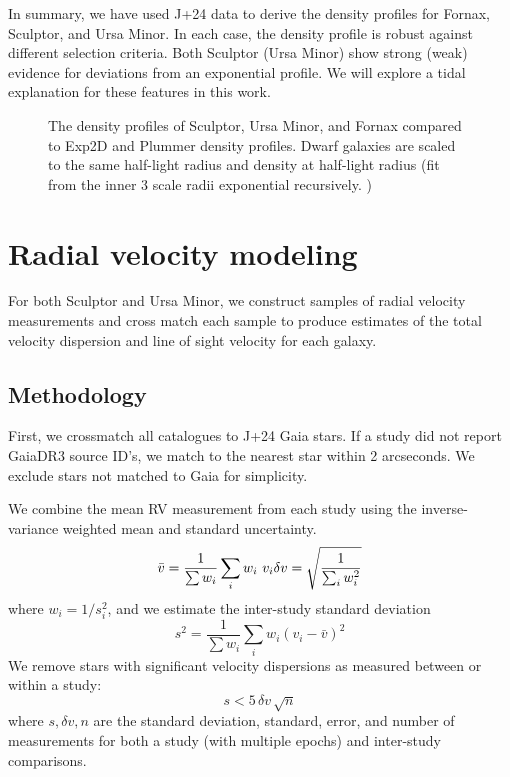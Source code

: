In summary, we have used J+24 data to derive the density profiles for
Fornax, Sculptor, and Ursa Minor. In each case, the density profile is
robust against different selection criteria. Both Sculptor (Ursa Minor)
show strong (weak) evidence for deviations from an exponential profile.
We will explore a tidal explanation for these features in this work.

\begin{figure}
\centering
{}
\caption[Classical dwarf density profiles]{The density profiles of
Sculptor, Ursa Minor, and Fornax compared to Exp2D and Plummer density
profiles. Dwarf galaxies are scaled to the same half-light radius and
density at half-light radius (fit from the inner 3 scale radii
exponential recursively. )}\label{fig:classical_dwarfs_densities}
\end{figure}

\section{Radial velocity modeling}\label{radial-velocity-modeling}

For both Sculptor and Ursa Minor, we construct samples of radial
velocity measurements and cross match each sample to produce estimates
of the total velocity dispersion and line of sight velocity for each
galaxy.

\subsection{Methodology}\label{methodology}

First, we crossmatch all catalogues to J+24 Gaia stars. If a study did
not report GaiaDR3 source ID's, we match to the nearest star within 2
arcseconds. We exclude stars not matched to Gaia for simplicity.

We combine the mean RV measurement from each study using the
inverse-variance weighted mean and standard uncertainty. \[
\bar v = \frac{1}{\sum w_i}\sum_i w_i\ v_{i} \\
\delta v = \sqrt{\frac{1}{\sum_i w_{i}^2}}
\] where \(w_i = 1/s_i^2\), and we estimate the inter-study standard
deviation \[
s^2 = \frac{1}{\sum w_i} \sum_i w_i (v_{i} - \bar v)^2
\] We remove stars with significant velocity dispersions as measured
between or within a study: \[
s < 5\,\delta v\,\sqrt{n}
\] where \(s, \delta v, n\) are the standard deviation, standard, error,
and number of measurements for both a study (with multiple epochs) and
inter-study comparisons.

